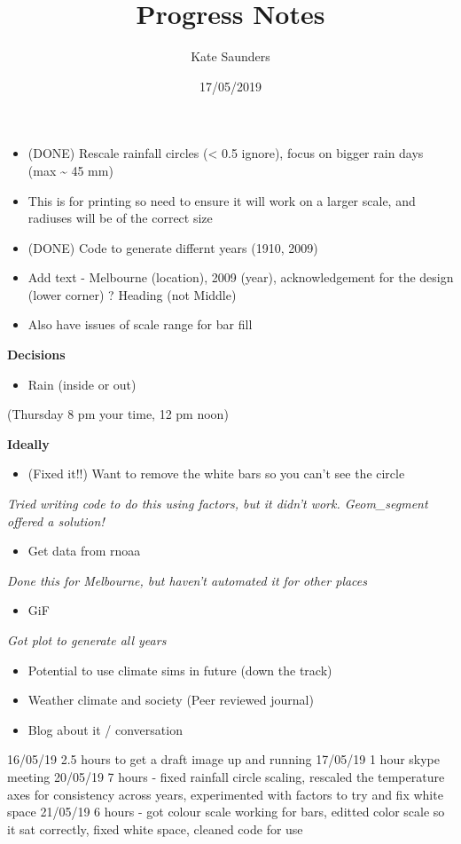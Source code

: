 \documentclass[]{article}
\title{Progress Notes}
\author{Kate Saunders}
\date{17/05/2019}
\providecommand{\tightlist}{%
  \setlength{\itemsep}{0pt}\setlength{\parskip}{0pt}}
\begin{document}
\maketitle

\begin{itemize}
\item
  (DONE) Rescale rainfall circles (\textless{} 0.5 ignore), focus on
  bigger rain days (max \textasciitilde{} 45 mm)
\item
  This is for printing so need to ensure it will work on a larger scale,
  and radiuses will be of the correct size
\item
  (DONE) Code to generate differnt years (1910, 2009)
\item
  Add text - Melbourne (location), 2009 (year), acknowledgement for the
  design (lower corner) ? Heading (not Middle)
\item
  Also have issues of scale range for bar fill
\end{itemize}

\textbf{Decisions}

\begin{itemize}
\tightlist
\item
  Rain (inside or out)
\end{itemize}

(Thursday 8 pm your time, 12 pm noon)

\textbf{Ideally}

\begin{itemize}
\tightlist
\item
  (Fixed it!!) Want to remove the white bars so you can't see the circle
\end{itemize}

\textit{Tried writing code to do this using factors, but it didn't work. Geom_segment offered a solution!}

\begin{itemize}
\tightlist
\item
  Get data from rnoaa
\end{itemize}

\textit{Done this for Melbourne, but haven't automated it for other places}

\begin{itemize}
\tightlist
\item
  GiF
\end{itemize}

\textit{Got plot to generate all years}

\begin{itemize}
\item
  Potential to use climate sims in future (down the track)
\item
  Weather climate and society (Peer reviewed journal)
\item
  Blog about it / conversation
\end{itemize}

 16/05/19 2.5 hours to get a draft image up and
running 17/05/19 1 hour skype meeting 20/05/19 7 hours - fixed rainfall
circle scaling, rescaled the temperature axes for consistency across
years, experimented with factors to try and fix white space 21/05/19 6
hours - got colour scale working for bars, editted color scale so it sat
correctly, fixed white space, cleaned code for use
\end{document}
